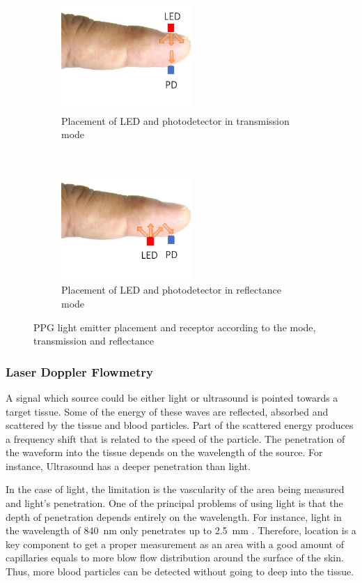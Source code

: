\begin{figure}[!htbp]
	\centering
	\begin{subfigure}[t]{0.45\textwidth}
		\centering
		\includegraphics[height=4cm]{figure7a}
		\caption{Placement of LED and photodetector in transmission mode}
		\label{fig:PPG transmission}
	\end{subfigure}%
	~ 
	\begin{subfigure}[t]{0.45\textwidth}
		\centering
		\includegraphics[height=4cm]{figure7b}
		\caption{Placement of LED and photodetector in reflectance mode}
		\label{fig:PPG reflectance}
	\end{subfigure}
	\caption[PPG sensors placemens as transmission and reflectance modes]{PPG light emitter placement and receptor according to the mode, transmission and reflectance}
	\label{fig:PPG modes}
\end{figure}

\subsubsection{Laser Doppler Flowmetry}
\label{section literature LDF}

A signal which source could be either light or ultrasound is pointed towards a target tissue. Some of the energy of these waves are reflected, absorbed and scattered by the tissue and blood particles. Part of the scattered energy produces a frequency shift that is related to the speed of the particle. The penetration of the waveform into the tissue depends on the wavelength of the source. For instance, Ultrasound has a deeper penetration than light. 

In the case of light, the limitation is the vascularity of the area being measured and light's penetration. One of the principal problems of using light is that the depth of penetration depends entirely on the wavelength. For instance, light in the wavelength of \SI{840}{\nano \metre} only penetrates up to \SI{2.5}{\milli\metre} \cite{bashkatov2005optical}. Therefore, location is a key component to get a proper measurement as an area with a good amount of capillaries equals to more blow flow distribution around the surface of the skin. Thus, more blood particles can be detected without going to deep into the tissue. 


